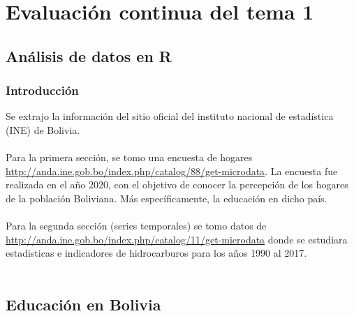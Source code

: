 \section*{\center Evaluación continua del tema 1}
\subsection*{\center Análisis de datos en R}
\vspace{2cm}

\begin{multicols}{2}

\subsubsection*{Introducción}
Se extrajo la información del sitio oficial del instituto nacional de estadística (INE) de Bolivia.\\\\
Para la primera sección, se tomo una encuesta de hogares \href{http://anda.ine.gob.bo/index.php/catalog/88/get-microdata}{http://anda.ine.gob.bo/index.php/catalog/88/get-microdata}. La encuesta fue realizada en el año 2020, con el objetivo de conocer la percepción de los hogares de la población Boliviana. Más específicamente, la educación en dicho país.\\\\
Para la segunda sección (series temporales) se tomo datos de \href{http://anda.ine.gob.bo/index.php/catalog/11/get-microdata}{http://anda.ine.gob.bo/index.php/catalog/11/get-microdata} donde se estudiara estadisticas e indicadores de hidrocarburos para los años  1990 al 2017.\\\\

\end{multicols}

\vspace{.5cm}

\subsection*{\center Educación en Bolivia}

